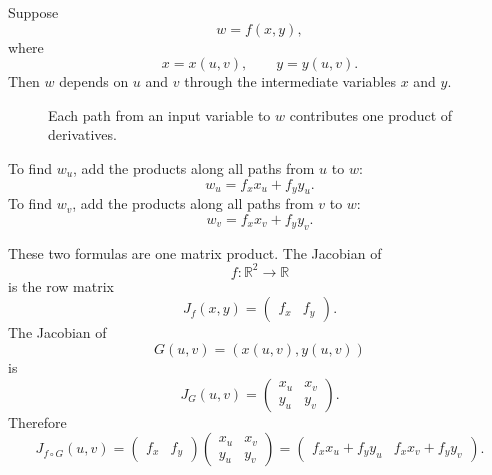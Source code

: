 Suppose
\[
    w=f(x,y),
\]
where
\[
    x=x(u,v),
    \qquad
    y=y(u,v).
\]
Then \(w\) depends on \(u\) and \(v\) through the intermediate variables \(x\) and \(y\).

\begin{figure}[h]
\centering
{}
\caption{Each path from an input variable to \(w\) contributes one product of
derivatives.}
\end{figure}

To find \(w_u\), add the products along all paths from \(u\) to \(w\):
\[
\boxed{
    w_u=f_xx_u+f_yy_u.
}
\]
To find \(w_v\), add the products along all paths from \(v\) to \(w\):
\[
\boxed{
    w_v=f_xx_v+f_yy_v.
}
\]

These two formulas are one matrix product.  The Jacobian of
\[
    f:\mathbb R^2\to\mathbb R
\]
is the row matrix
\[
    J_f(x,y)=
    \begin{pmatrix}
        f_x & f_y
    \end{pmatrix}.
\]
The Jacobian of
\[
    G(u,v)=(x(u,v),y(u,v))
\]
is
\[
    J_G(u,v)
    =
    \begin{pmatrix}
        x_u & x_v\\
        y_u & y_v
    \end{pmatrix}.
\]
Therefore
\[
    J_{f\circ G}(u,v)
    =
    \begin{pmatrix}
        f_x & f_y
    \end{pmatrix}
    \begin{pmatrix}
        x_u & x_v\\
        y_u & y_v
    \end{pmatrix}
    =
    \begin{pmatrix}
        f_xx_u+f_yy_u
        &
        f_xx_v+f_yy_v
    \end{pmatrix}.
\]

